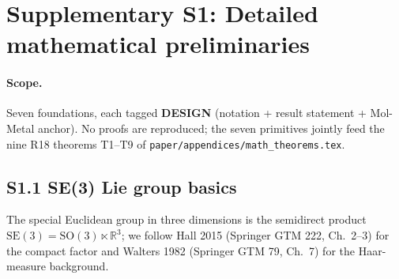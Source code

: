 %

\section*{Supplementary S1: Detailed mathematical preliminaries}

\providecommand{\MEASURED}{\textbf{MEASURED}}
\providecommand{\PROJECTED}{\textbf{PROJECTED}}
\providecommand{\DESIGN}{\textbf{DESIGN}}

\paragraph{Scope.}
Seven foundations, each tagged \DESIGN{} (notation + result
statement + Mol-Metal anchor).  No proofs are reproduced; the
seven primitives jointly feed the nine R18 theorems T1--T9 of
\texttt{paper/appendices/math\_theorems.tex}.

\subsection*{S1.1 SE(3) Lie group basics}
\label{supp:s1-se3}

The special Euclidean group in three dimensions is the semidirect
product $\mathrm{SE}(3) = \mathrm{SO}(3) \ltimes \mathbb{R}^{3}$; we
follow Hall 2015 (Springer GTM 222, Ch.~2--3) for the compact
factor and Walters 1982 (Springer GTM 79, Ch.~7) for the
Haar-measure background.

